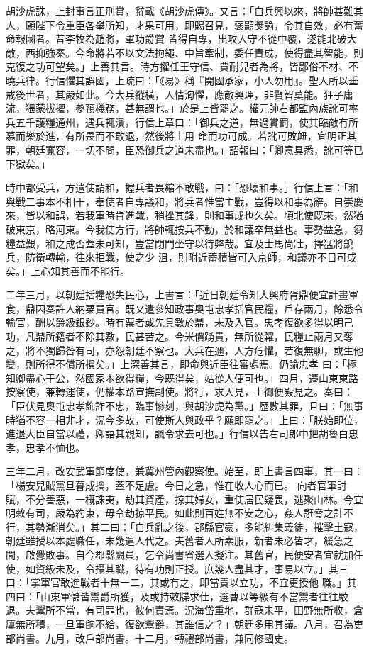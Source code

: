 \begin{pinyinscope}
 胡沙虎誅，上封事言正刑賞，辭載《胡沙虎傳》。又言：「自兵興以來，將帥甚難其人，願陛下令重臣各舉所知，才果可用，即賜召見，褒顯獎諭，令其自效，必有奮命報國者。昔李牧為趙將，軍功爵賞
 皆得自專，出攻入守不從中覆，遂能北破大敵，西抑強秦。今命將若不以文法拘繩、中旨牽制，委任責成，使得盡其智能，則克復之功可望矣。」上善其言。時方擢任王守信、賈耐兒者為將，皆鄙俗不材、不曉兵律。行信懼其誤國，上疏曰：「《易》稱『開國承家，小人勿用』。聖人所以垂戒後世者，其嚴如此。今大兵縱橫，人情洶懼，應敵興理，非賢智莫能。狂子庸流，猥蒙拔擢，參預機務，甚無謂也。」於是上皆罷之。權元帥右都監內族訛可率兵五千護糧通州，遇兵輒潰，行信上章曰：「御兵之道，無過賞罰，使其臨敵有所慕而樂於進，有所畏而不敢退，然後將士用
 命而功可成。若訛可敗衄，宜明正其罪，朝廷寬容，一切不問，臣恐御兵之道未盡也。」詔報曰：「卿意具悉，訛可等已下獄矣。」



 時中都受兵，方遣使請和，握兵者畏縮不敢戰，曰：「恐壞和事。」行信上言：「和與戰二事本不相干，奉使者自專議和，將兵者惟當主戰，豈得以和事為辭。自崇慶來，皆以和誤，若我軍時肯進戰，稍挫其鋒，則和事成也久矣。頃北使既來，然猶破東京，略河東。今我使方行，將帥輒按兵不動，於和議卒無益也。事勢益急，芻糧益艱，和之成否蓋未可知，豈當閉門坐守以待弊哉。宜及士馬尚壯，擇猛將銳兵，防衛轉輸，往來拒戰，使之少
 沮，則附近蓄積皆可入京師，和議亦不日可成矣。」上心知其善而不能行。



 二年三月，以朝廷括糧恐失民心，上書言：「近日朝廷令知大興府胥鼎便宜計畫軍食，鼎因奏許人納粟買官。既又遣參知政事奧屯忠孝括官民糧，戶存兩月，餘悉令輸官，酬以爵級銀鈔。時有粟者或先具數於鼎，未及入官。忠孝復欲多得以明己功，凡鼎所籍者不除其數，民甚苦之。今米價踴貴，無所從糴，民糧止兩月又奪之，將不獨歸咎有司，亦怨朝廷不察也。大兵在邇，人方危懼，若復無聊，或生他變，則所得不償所損矣。」上深善其言，即命與近臣往審處焉。仍諭忠孝
 曰：「極知卿盡心于公，然國家本欲得糧，今既得矣，姑從人便可也。」四月，遷山東東路按察使，兼轉運使，仍權本路宣撫副使。將行，求入見，上御便殿見之。奏曰：「臣伏見奧屯忠孝飾詐不忠，臨事慘刻，與胡沙虎為黨。」歷數其罪，且曰：「無事時猶不容一相非才，況今多故，可使斯人與政乎？願即罷之。」上曰：「朕始即位，進退大臣自當以禮，卿語其親知，諷令求去可也。」行信以告右司郎中把胡魯白忠孝，忠孝不恤也。



 三年二月，改安武軍節度使，兼冀州管內觀察使。始至，即上書言四事，其一曰：「楊安兒賊黨旦暮成擒，蓋不足慮。今日之急，惟在收人心而已。
 向者官軍討賦，不分善惡，一概誅夷，劫其資產，掠其婦女，重使居民疑畏，逃聚山林。今宜明敕有司，嚴為約束，毋令劫掠平民。如此則百姓無不安之心，姦人誑脅之計不行，其勢漸消矣。」其二曰：「自兵亂之後，郡縣官豪，多能糾集義徒，摧擊土寇，朝廷雖授以本處職任，未幾遣人代之。夫舊者人所素服，新者未必皆才，緩急之間，啟釁敗事。自今郡縣闕員，乞令尚書省選人擬注。其舊官，民便安者宜就加任使，如資級未及，令攝其職，待有功則正授。庶幾人盡其才，事易以立。」其三曰：「掌軍官敢進戰者十無一二，其或有之，即當責以立功，不宜更授他
 職。」其四曰：「山東軍儲皆鬻爵所獲，及或持敕牒求仕，選曹以等級有不當鬻者往往駮退。夫鬻所不當，有司罪也，彼何責焉。況海岱重地，群寇未平，田野無所收，倉廩無所積，一旦軍餉不給，復欲鬻爵，其誰信之？」朝廷多用其議。八月，召為吏部尚書。九月，改戶部尚書。十二月，轉禮部尚書，兼同修國史。




\end{pinyinscope}
